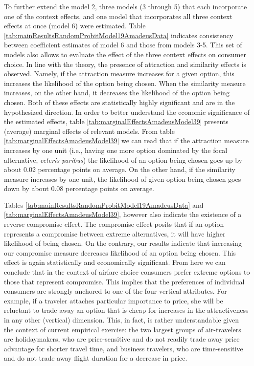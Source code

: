 \documentclass[a4paper,12pt]{article}
\begin{document}
To further extend the model 2, three models (3 through 5) that each incorporate one of the context effects, and one model that incorporates all three context effects at once (model 6) were estimated. Table \ref{tab:mainResultsRandomProbitModel19AmadeusData} indicates consistency between coefficient estimates of model 6 and those from models 3-5. This set of models also allows to evaluate the effect of the three context effects on consumer choice. In line with the theory, the presence of attraction and similarity effects is observed. Namely, if the attraction measure increases for a given option, this increases the likelihood of the option being chosen. When the similarity measure increases, on the other hand, it decreases the likelihood of the option being chosen. Both of these effects are statistically highly significant and are in the hypothesized direction. In order to better understand the economic significance of the estimated effects, table \ref{tab:marginalEffectsAmadeusModel39} presents (average) marginal effects of relevant models. From table \ref{tab:marginalEffectsAmadeusModel39} we can read that if the attraction measure increases by one unit (i.e., having one more option dominated by the focal alternative, \textit{ceteris paribus}) the likelihood of an option being chosen goes up by about 0.02 percentage points on average. On the other hand, if the similarity measure increases by one unit, the likelihood of given option being chosen goes down by about 0.08 percentage points on average.

Tables \ref{tab:mainResultsRandomProbitModel19AmadeusData} and \ref{tab:marginalEffectsAmadeusModel39}, however also indicate the existence of a reverse compromise effect. The compromise effect posits that if an option represents a compromise between extreme alternatives, it will have higher likelihood of being chosen. On the contrary, our results indicate that increasing our compromise measure decreases likelihood of an option being chosen. This effect is again statistically and economically significant. From here we can conclude that in the context of airfare choice consumers prefer extreme options to those that represent compromise. This implies that the preferences of individual consumers are strongly anchored to one of the four vertical attributes. For example, if a traveler attaches particular importance to price, she will be reluctant to trade away an option that is cheap for increases in the attractiveness in any other (vertical) dimension. This, in fact, is rather understandable given the context of current empirical exercise: the two largest groups of air-travelers are holidaymakers, who are price-sensitive and do not readily trade away price advantage for shorter travel time, and business travelers, who are time-sensitive and do not trade away flight duration for a decrease in price.
\end{document}
